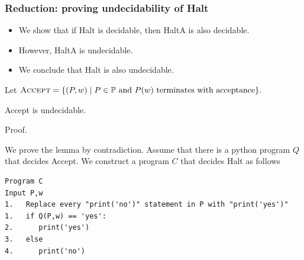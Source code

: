 
\begin{frame}
  \frametitle{Reduction: proving undecidability of {\sc Halt}}

  \begin{itemize}
  \item We show that if {\sc Halt} is decidable, then {\sc HaltA} is
    also decidable.
  \item However, {\sc HaltA is undecidable}.
  \item We conclude that {\sc Halt} is also undecidable.
  \end{itemize}
\end{frame}


\begin{frame}[fragile=true]
  
  {\small
    Let $\textsc{Accept} = \{(P,w) \;|\;
    \mbox{$P\in{\mathbb P}$ and $P(w)$ terminates with acceptance}\}.$
  }
  
  \begin{lemma}
    {\sc Accept} is undecidable.
  \end{lemma}
  \begin{block}{Proof.}

      We prove the lemma by contradiction.  Assume that there is a
      python program $Q$ that decides {\sc Accept}.  We
      construct a program $C$ that decides {\sc Halt} as follows 
      
      {\footnotesize
\begin{verbatim}
Program C       
Input P,w       
1.   Replace every "print('no')" statement in P with "print('yes')"
1.   if Q(P,w) == 'yes':
2.      print('yes')
3.   else
4.      print('no')
\end{verbatim}
      }

  \end{block}
\end{frame}

